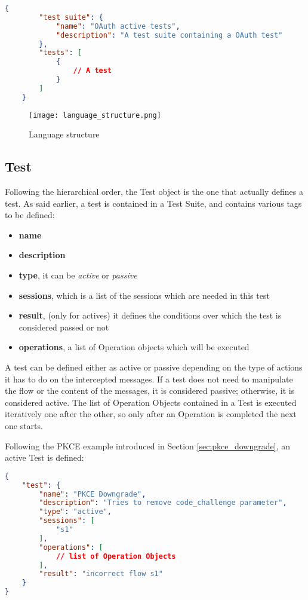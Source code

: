 \begin{lstlisting}[language=json, caption=Test Suite definition, label={lst:test_suite_definition}]
    {
        "test suite": {
            "name": "OAuth active tests",
            "description": "A test suite containing a OAuth test"
        },
        "tests": [
            {
                // A test
            }
        ]
    }
\end{lstlisting}

\begin{figure}[h]
    \texttt{[image: language\_structure.png]}
    \caption{Language structure}
    \label{fig:language_structure}
\end{figure}

\subsection{Test}
Following the hierarchical order, the Test object is the one that actually defines a test. As said earlier, a test is contained in a Test Suite, and contains various tags to be defined:
\begin{itemize}
    \item \textbf{name}
    \item \textbf{description}
    \item \textbf{type}, it can be \textit{active} or \textit{passive}
    \item \textbf{sessions}, which is a list of the sessions which are needed in this test
    \item \textbf{result}, (only for actives) it defines the conditions over which the test is considered passed or not
    \item \textbf{operations}, a list of Operation objects which will be executed
\end{itemize}
A test can be defined either as active or passive depending on the type of actions it has to do on the intercepted messages. If a test does not need to manipulate the flow or the content of the messages, it is considered passive; otherwise, it is considered active.
The list of Operation Objects contained in a Test is executed iteratively one after the other, so only after an Operation is completed the next one starts.

Following the \gls{PKCE} example introduced in Section \ref{sec:pkce_downgrade}, an active Test is defined:

\begin{lstlisting}[language=json, caption=Active test definition, label={lst:active_test_definition}]
{
    "test": {
        "name": "PKCE Downgrade",
        "description": "Tries to remove code_challenge parameter",
        "type": "active",
        "sessions": [
            "s1"
        ],
        "operations": [
            // list of Operation Objects
        ],
        "result": "incorrect flow s1"
    }
}    
\end{lstlisting} 

